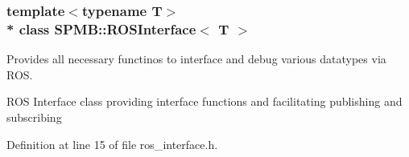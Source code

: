 \subsubsection*{template$<$typename T$>$\\*
class S\+P\+M\+B\+::\+R\+O\+S\+Interface$<$ T $>$}

Provides all necessary functinos to interface and debug various datatypes via R\+OS. 

R\+OS Interface class providing interface functions and facilitating publishing and subscribing 

Definition at line 15 of file ros\+\_\+interface.\+h.

